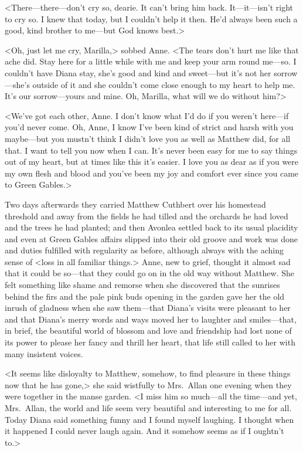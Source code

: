 <There—there—don't cry so, dearie. It can't bring him back. It—it—isn't right to cry so. I knew that today, but I couldn't help it then. He'd always been such a good, kind brother to me—but God knows best.>

<Oh, just let me cry, Marilla,> sobbed Anne. <The tears don't hurt me like that ache did. Stay here for a little while with me and keep your arm round me—so. I couldn't have Diana stay, she's good and kind and sweet—but it's not her sorrow—she's outside of it and she couldn't come close enough to my heart to help me. It's our sorrow—yours and mine. Oh, Marilla, what will we do without him?>

<We've got each other, Anne. I don't know what I'd do if you weren't here—if you'd never come. Oh, Anne, I know I've been kind of strict and harsh with you maybe—but you mustn't think I didn't love you as well as Matthew did, for all that. I want to tell you now when I can. It's never been easy for me to say things out of my heart, but at times like this it's easier. I love you as dear as if you were my own flesh and blood and you've been my joy and comfort ever since you came to Green Gables.>

Two days afterwards they carried Matthew Cuthbert over his homestead threshold and away from the fields he had tilled and the orchards he had loved and the trees he had planted; and then Avonlea settled back to its usual placidity and even at Green Gables affairs slipped into their old groove and work was done and duties fulfilled with regularity as before, although always with the aching sense of <loss in all familiar things.> Anne, new to grief, thought it almost sad that it could be so—that they could go on in the old way without Matthew. She felt something like shame and remorse when she discovered that the sunrises behind the firs and the pale pink buds opening in the garden gave her the old inrush of gladness when she saw them—that Diana's visits were pleasant to her and that Diana's merry words and ways moved her to laughter and smiles—that, in brief, the beautiful world of blossom and love and friendship had lost none of its power to please her fancy and thrill her heart, that life still called to her with many insistent voices.

<It seems like disloyalty to Matthew, somehow, to find pleasure in these things now that he has gone,> she said wistfully to Mrs.~Allan one evening when they were together in the manse garden. <I miss him so much—all the time—and yet, Mrs.~Allan, the world and life seem very beautiful and interesting to me for all. Today Diana said something funny and I found myself laughing. I thought when it happened I could never laugh again. And it somehow seems as if I oughtn't to.>

